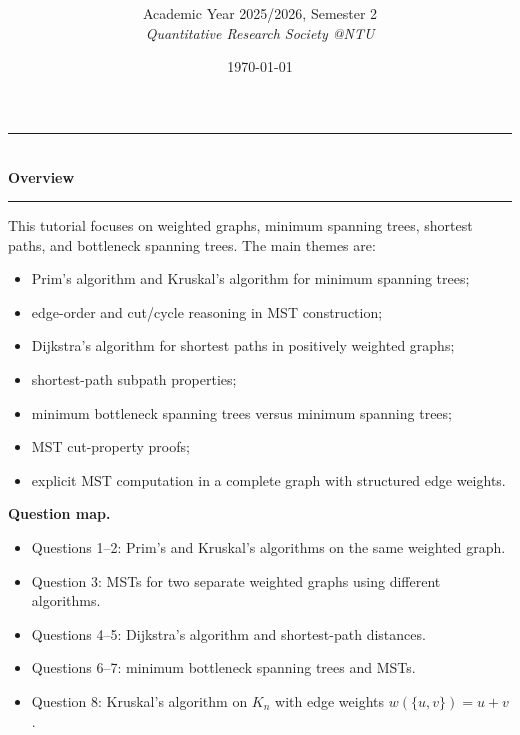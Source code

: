 \documentclass[12pt]{article}
\title{
\CourseCode\ \CourseName \\[0.3em]
\large \DocType
}
\author{
  Academic Year 2025/2026, Semester 2 \\[0.25em]
  \textit{Quantitative Research Society @NTU}
}
\date{\today}
\begin{document}
\maketitle
\thispagestyle{plainfirst}
\pagestyle{main}

\begin{center}
  \rule{0.82\textwidth}{0.4pt}\\[4pt]
  \textbf{Overview}\\[2pt]
  \rule{0.82\textwidth}{0.4pt}
\end{center}

\noindent
This tutorial focuses on weighted graphs, minimum spanning trees, shortest paths, and bottleneck spanning trees. The main themes are:
\begin{itemize}[leftmargin=*]
  \item Prim's algorithm and Kruskal's algorithm for minimum spanning trees;
  \item edge-order and cut/cycle reasoning in MST construction;
  \item Dijkstra's algorithm for shortest paths in positively weighted graphs;
  \item shortest-path subpath properties;
  \item minimum bottleneck spanning trees versus minimum spanning trees;
  \item MST cut-property proofs;
  \item explicit MST computation in a complete graph with structured edge weights.
\end{itemize}

\noindent
\textbf{Question map.}
\begin{itemize}[leftmargin=*]
  \item Questions 1--2: Prim's and Kruskal's algorithms on the same weighted graph.
  \item Question 3: MSTs for two separate weighted graphs using different algorithms.
  \item Questions 4--5: Dijkstra's algorithm and shortest-path distances.
  \item Questions 6--7: minimum bottleneck spanning trees and MSTs.
  \item Question 8: Kruskal's algorithm on $K_n$ with edge weights $w(\{u,v\})=u+v$.
\end{itemize}

\newpage
\tableofcontents
\end{document}
